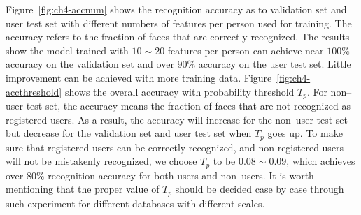 Figure~\ref{fig:ch4-accnum} shows the recognition accuracy as to validation set and user test set with different numbers of features per person used for training. The accuracy refers to the fraction of faces that are correctly recognized. The results show the model trained with $10 \sim 20$ features per person can achieve near $100\%$ accuracy on the validation set and over $90\%$ accuracy on the user test set. Little improvement can be achieved with more training data. Figure~\ref{fig:ch4-accthreshold} shows the overall accuracy with probability threshold $T_p$. For non--user test set, the accuracy means the fraction of faces that are not recognized as registered users. As a result, the accuracy will increase for the non--user test set but decrease for the validation set and user test set when $T_p$ goes up. To make sure that registered users can be correctly recognized, and non-registered users will not be mistakenly recognized, we choose $T_p$ to be $0.08 \sim 0.09$, which achieves over $80\%$ recognition accuracy for both users and non--users. It is worth mentioning that the proper value of $T_p$ should be decided case by case through such experiment for different databases with different scales.

